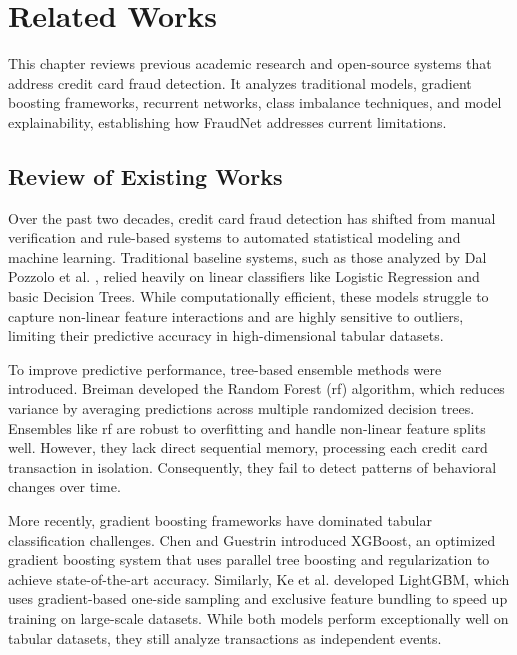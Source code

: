 \chapter{Related Works}

This chapter reviews previous academic research and open-source systems that address credit card fraud detection. It analyzes traditional models, gradient boosting frameworks, recurrent networks, class imbalance techniques, and model explainability, establishing how FraudNet addresses current limitations.

\section{Review of Existing Works}

Over the past two decades, credit card fraud detection has shifted from manual verification and rule-based systems to automated statistical modeling and machine learning. Traditional baseline systems, such as those analyzed by Dal Pozzolo et al. \cite{pozzolo2015calibrating}, relied heavily on linear classifiers like Logistic Regression and basic Decision Trees. While computationally efficient, these models struggle to capture non-linear feature interactions and are highly sensitive to outliers, limiting their predictive accuracy in high-dimensional tabular datasets.

To improve predictive performance, tree-based ensemble methods were introduced. Breiman \cite{breiman2001random} developed the Random Forest (\gls{rf}) algorithm, which reduces variance by averaging predictions across multiple randomized decision trees. Ensembles like \gls{rf} are robust to overfitting and handle non-linear feature splits well. However, they lack direct sequential memory, processing each credit card transaction in isolation. Consequently, they fail to detect patterns of behavioral changes over time.

More recently, gradient boosting frameworks have dominated tabular classification challenges. Chen and Guestrin \cite{chen2016xgboost} introduced XGBoost, an optimized gradient boosting system that uses parallel tree boosting and regularization to achieve state-of-the-art accuracy. Similarly, Ke et al. \cite{ke2017lightgbm} developed LightGBM, which uses gradient-based one-side sampling and exclusive feature bundling to speed up training on large-scale datasets. While both models perform exceptionally well on tabular datasets, they still analyze transactions as independent events.

